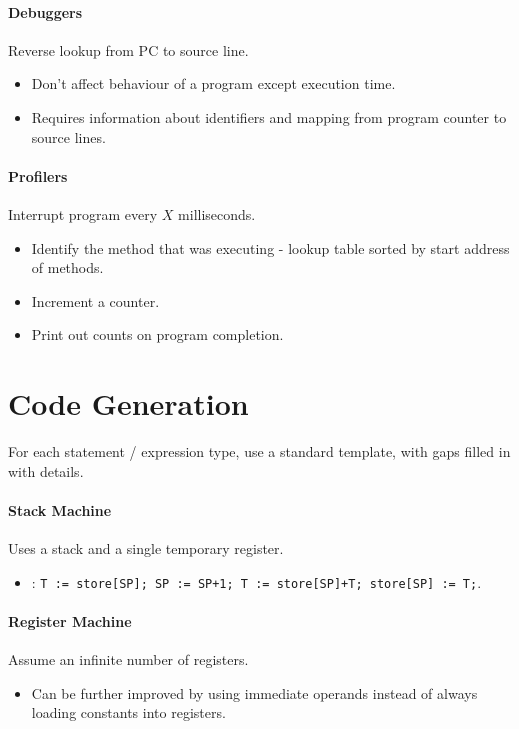 \documentclass[twocolumn,english]{article}
\let\emph\relax
\begin{document}
\paragraph{Debuggers}

Reverse lookup from PC to source line.
\begin{itemize}
\item Don't affect behaviour of a program except execution time.
\item Requires information about identifiers and mapping from program counter
to source lines.
\end{itemize}

\paragraph{Profilers}

Interrupt program every $X$ milliseconds.
\begin{itemize}
\item Identify the method that was executing - lookup table sorted by start
address of methods.
\item Increment a counter.
\item Print out counts on program completion.
\end{itemize}

\section{Code Generation}

For each statement / expression type, use a standard template, with
gaps filled in with details.

\paragraph{Stack Machine}

Uses a stack and a single temporary register.
\begin{itemize}
\item \texttt{\emph{Add}}: \texttt{T := store{[}SP{]}; SP := SP+1; T :=
store{[}SP{]}+T; store{[}SP{]} := T;}.
\end{itemize}

\paragraph{Register Machine}

Assume an infinite number of registers.
\begin{itemize}
\item Can be further improved by using immediate operands instead of always
loading constants into registers.
\end{itemize}
\end{document}

